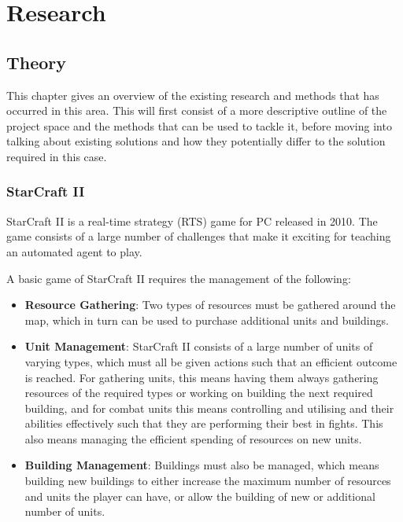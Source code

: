 \chapter{Research}%
\label{research}

\section{Theory}

This chapter gives an overview of the existing research and methods that
has occurred in this area. This will first consist of a more descriptive
outline of the project space and the methods that can be used to tackle it,
before moving into talking about existing solutions and how they potentially
differ to the solution required in this case.

\subsection{StarCraft II}

StarCraft II is a real-time strategy (RTS) game for PC released in 2010.
The game consists of a large number of challenges that make it exciting for
teaching an automated agent to play.

A basic game of StarCraft II requires the management of the following:

\begin{itemize}
    \item \textbf{Resource Gathering}: Two types of resources must be gathered
        around the map, which in turn can be used to purchase additional units
        and buildings.
    \item \textbf{Unit Management}: StarCraft II consists of a large number of
        units of varying types, which must all be given actions such that an
        efficient outcome is reached. For gathering units, this means having
        them always gathering resources of the required types or working on
        building the next required building, and for combat units
        this means controlling and utilising and their abilities effectively
        such that they are performing their best in fights. This also means
        managing the efficient spending of resources on new units.
    \item \textbf{Building Management}: Buildings must also be managed, which
        means building new buildings to either increase the maximum number of
        resources and units the player can have, or allow the building of new or
        additional number of units.
\end{itemize}

